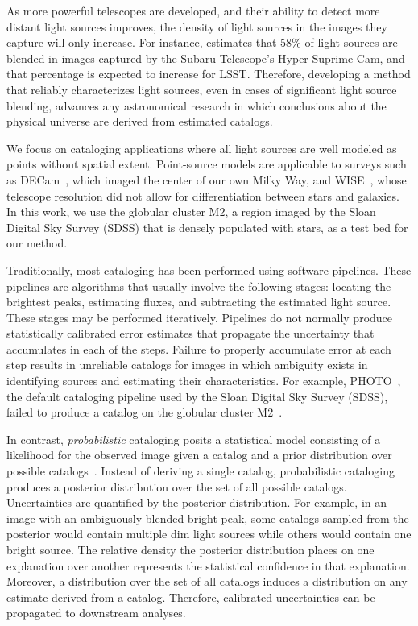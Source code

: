 As more powerful telescopes are developed, and their ability to detect more distant light sources improves, the density of light sources in the images they capture will only increase. 
For instance, \cite{bosch2018hyper} estimates that 58\% of light sources are blended in images captured by the Subaru Telescope’s Hyper Suprime-Cam, and that percentage is expected to increase for LSST. 
Therefore, developing a method that reliably characterizes light sources, even in cases of significant light source blending, 
advances any astronomical research in which conclusions about the physical universe are derived from estimated catalogs. 

We focus on cataloging applications where all light sources are well modeled as points without spatial extent. 
Point-source models are applicable to surveys such as DECam~\cite{Schlafly_2018_DECam}, which imaged the center of our own Milky Way, and WISE~\cite{Wright_2010_WISESurvey}, whose telescope resolution did not allow for differentiation between stars and galaxies.
In this work, we use the globular cluster M2, a region imaged by the Sloan Digital Sky Survey (SDSS) that is densely populated with stars, as a test bed for our method. 

\bigbreak


Traditionally, most cataloging has been performed using software pipelines.
These pipelines are algorithms that usually involve the following stages: locating the brightest peaks, estimating fluxes, and subtracting the estimated light source.
These stages may be performed iteratively.
Pipelines do not normally produce statistically calibrated error estimates that propagate 
the uncertainty that accumulates in each of the steps. 
Failure to properly accumulate error at each step results in unreliable catalogs for images in which ambiguity exists in identifying sources and estimating their characteristics.
For example, PHOTO~\cite{lupton2001sdss}, the default cataloging pipeline used by the Sloan Digital Sky Survey (SDSS), failed to 
produce a catalog on the globular cluster M2~\cite{Portillo_2017}. 

In contrast, {\itshape probabilistic} cataloging posits a statistical model consisting of a likelihood for the observed image given a catalog and a prior distribution over possible catalogs~\cite{Portillo_2017, Brewer_2013, Feder_2019}. 
Instead of deriving a single catalog, probabilistic cataloging produces a posterior distribution over the set of all possible catalogs. 
Uncertainties are quantified by the posterior distribution. 
For example, in an image with an ambiguously blended bright peak, some catalogs sampled from the posterior would contain multiple dim light sources while others would contain one bright source. 
The relative density the posterior distribution places on one explanation over another represents the statistical confidence in that explanation. 
Moreover, a distribution over the set of all catalogs induces a distribution on any estimate derived from a catalog. Therefore, calibrated uncertainties can be propagated to downstream analyses.  

